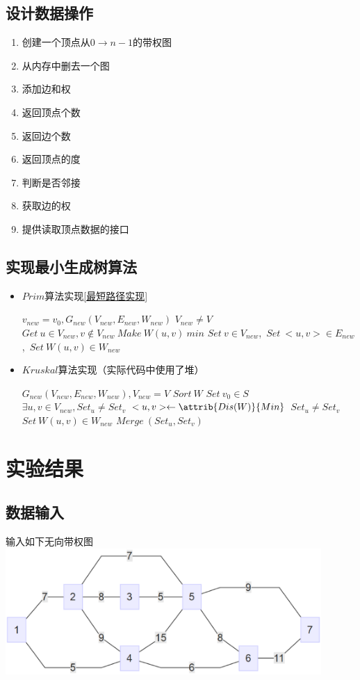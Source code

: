 \documentclass[a4paper,10pt]{ctexart}
\begin{document}
\subsection{设计数据操作}
\begin{enumerate}
  \item 创建一个顶点从$0 \to n-1$的带权图
  \item 从内存中删去一个图
  \item 添加边和权
  \item 返回顶点个数
  \item 返回边个数
  \item 返回顶点的度
  \item 判断是否邻接
  \item 获取边的权
  \item 提供读取顶点数据的接口
\end{enumerate}

\subsection{实现最小生成树算法}
\begin{itemize}
\item $Prim$算法实现\ref{最短路径实现}
\begin{codebox}
\li $v_{new} = v_0,G_{new}(V_{new},E_{new},W_{new})$
\li \While $V_{new} \ne V$
    \Do
\li     $Get\ u\in V_{new},v\not\in V_{new}\ Make\ W(u,v)\ min$
\li     $Set\ v \in V_{new}$,\ $Set\ <u,v>\in E_{new}$,\ $Set\ W(u,v)\in W_{new}$
    \End
\end{codebox}
\item $Kruskal$算法实现（实际代码中使用了堆）
\begin{codebox}
\li $G_{new}(V_{new},E_{new},W_{new}),V_{new}=V$
\li $Sort\ W$
\li $Set \  v_0 \in S$
\li \While $\exists u,v \in V_{new},Set_u \not= Set_v$
    \Do
\li     $<u,v> \gets \attrib{Dis(W)}{Min}$
\li     \If $Set_u \not= Set_v$
        \Do
\li        $Set \ W(u,v) \in W_{new}$
\li        $Merge\ (Set_u,Set_v)$
        \End
    \End
\end{codebox}
\end{itemize}

\section{实验结果}
\subsection{数据输入}
输入如下无向带权图\\
\includegraphics[width=0.9\textwidth]{../Pics/Test-MiniTree.eps}
\end{document}
